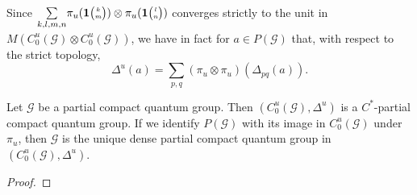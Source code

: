 Since $\underset{k,l,m,n}{\sum} \pi_u(\mathbf{1}{\tiny {\begin{pmatrix} k\\m\end{pmatrix}}})\otimes \pi_u(\mathbf{1}{\tiny {\begin{pmatrix} l\\n\end{pmatrix}}})$ converges strictly to the unit in $M(C_0^u(\mathscr{G})\otimes C_0^u(\mathscr{G}))$, we have in fact for $a\in P(\mathscr{G})$ that, with respect to the strict topology, \[\Delta^u(a) = \sum_{p,q} (\pi_{u} \otimes \pi_{u})(\Delta_{pq}(a)).\]

\begin{Prop}
  Let $\mathscr{G}$ be a partial compact quantum group. Then $(C^{u}_{0}(\mathscr{G}),\Delta^{u})$  is a $C^{*}$-partial compact quantum group. If we identify $P(\mathscr{G})$ with its image in $C^{u}_{0}(\mathscr{G})$ under $\pi_{u}$, then $\mathscr{G}$ is the unique dense partial compact quantum group in $(C^{u}_{0}(\mathscr{G}),\Delta^{u})$.
\end{Prop}
\begin{proof}
  
\end{proof}



